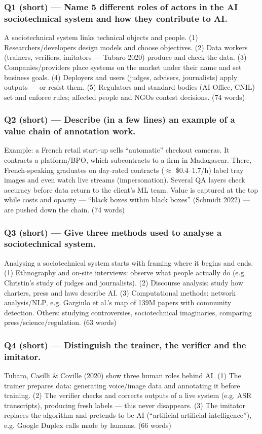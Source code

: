 \documentclass[11pt,a4paper]{article}
\begin{document}
\subsubsection*{Q1 (short) — Name 5 different roles of actors in the AI sociotechnical system and how they contribute to AI.}
A sociotechnical system links technical objects and people. (1) Researchers/developers design models and choose objectives. (2) Data workers (trainers, verifiers, imitators — Tubaro 2020) produce and check the data. (3) Companies/providers place systems on the market under their name and set business goals. (4) Deployers and users (judges, advisers, journalists) apply outputs — or resist them. (5) Regulators and standard bodies (AI Office, CNIL) set and enforce rules; affected people and NGOs contest decisions. {\small\color{gray}(74 words)}
\subsubsection*{Q2 (short) — Describe (in a few lines) an example of a value chain of annotation work.}
Example: a French retail start-up sells “automatic” checkout cameras. It contracts a platform/BPO, which subcontracts to a firm in Madagascar. There, French-speaking graduates on day-rated contracts ($\approx$ \$0.4–1.7/h) label tray images and even watch live streams (impersonation). Several QA layers check accuracy before data return to the client’s ML team. Value is captured at the top while costs and opacity — “black boxes within black boxes” (Schmidt 2022) — are pushed down the chain. {\small\color{gray}(74 words)}
\subsubsection*{Q3 (short) — Give three methods used to analyse a sociotechnical system.}
Analysing a sociotechnical system starts with framing where it begins and ends. (1) Ethnography and on-site interviews: observe what people actually do (e.g. Christin’s study of judges and journalists). (2) Discourse analysis: study how charters, press and laws describe AI. (3) Computational methods: network analysis/NLP, e.g. Gargiulo et al.’s map of 139M papers with community detection. Others: studying controversies, sociotechnical imaginaries, comparing press/science/regulation. {\small\color{gray}(63 words)}
\subsubsection*{Q4 (short) — Distinguish the trainer, the verifier and the imitator.}
Tubaro, Casilli \& Coville (2020) show three human roles behind AI. (1) The trainer prepares data: generating voice/image data and annotating it before training. (2) The verifier checks and corrects outputs of a live system (e.g. ASR transcripts), producing fresh labels — this never disappears. (3) The imitator replaces the algorithm and pretends to be AI (“artificial artificial intelligence”), e.g. Google Duplex calls made by humans. {\small\color{gray}(66 words)}
\end{document}
